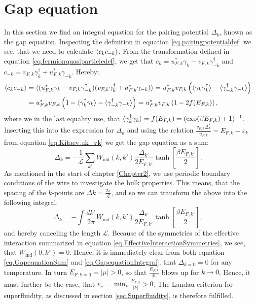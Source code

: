 \section{Gap equation} \label{sec.pairingpotential.integralequation}
In this section we find an integral equation for the pairing potential $\Delta_k$, known as the gap equation. Inspecting the definition in equation \eqref{eq.pairingpotentialdef} we see, that we need to calculate $\braket{ c_k c_{-k} }$. From the transformation defined in equation \eqref{eq.fermionquasiparticledef}, we get that $c_k = u^*_{F,k}\gamma_k - v_{F,k}\gamma^\dagger_{-k}$ and $c_{-k} = v_{F,k}\gamma^\dagger_k + u^*_{F,k}\gamma_{-k}$. Hereby:
\begin{align}
\braket{c_k c_{-k}} &= \braket{ (u^*_{F,k}\gamma_k - v_{F,k}\gamma^\dagger_{-k}) (v_{F,k}\gamma^\dagger_k + u^*_{F,k}\gamma_{-k}) } = u^*_{F,k}v_{F,k}\left( \braket{ \gamma_k \gamma^\dagger_{k} } - \braket{ \gamma^\dagger_{-k} \gamma_{-k} } \right)  \nonumber \\
& =  u^*_{F,k}v_{F,k}\left( 1 - \braket{ \gamma^\dagger_{k} \gamma_k } - \braket{ \gamma^\dagger_{-k} \gamma_{-k} } \right) = u^*_{F,k}v_{F,k}\left(1 - 2f(E_{F,k})\right), \nonumber
\end{align}
where we in the last equality use, that $\braket{ \gamma^\dagger_{k} \gamma_{k} }= f(E_{F,k})=(\exp(\beta E_{F,k})+1)^{-1} $. Inserting this into the expression for $\Delta_k$ and using the relation $\frac{v_{F,k}\Delta^*_k}{u_{F,k}}=E_{F,k}-\varepsilon_k$ from equation \eqref{eq.Kitaev.uk_vk} we get the gap equation as a sum:
\begin{equation}
\Delta_k = - \frac{1}{\mathcal{L}}\sum_{k'} W_{\text{ind}}(k,k')\frac{\Delta_{k'}}{2E_{F,k'}}\tanh\left[\frac{\beta E_{F,k'}}{2}\right].
\label{eq.GapequationSum}
\end{equation} 
As mentioned in the start of chapter \ref{Chapter2}, we use periodic boundary conditions of the wire to investigate the bulk properties. This means, that the spacing of the $k$-points are $\Delta k = \frac{2\pi}{\mathcal{L}}$, and so we can transform the above into the following integral:
\begin{equation}
\Delta_k = - \int \frac{dk'}{2\pi} W_{\text{ind}}(k,k')\frac{\Delta_{k'}}{2E_{F,k'}}\tanh\left[\frac{\beta E_{F,k'}}{2}\right], 
\label{eq.GapequationIntegral}
\end{equation} 
and hereby canceling the length $\mathcal{L}$. Because of the symmetries of the effective interaction summarized in equation \eqref{eq.EffectiveInteractionSymmetries}, we see, that $W_{\text{ind}}(0,k') = 0$. Hence, it is immediately clear from both equation \eqref{eq.GapequationSum} and \eqref{eq.GapequationIntegral}, that $\Delta_{k=0} = 0$ for any temperature. In turn $E_{F, k=0} = |\mu| > 0$, so that $\frac{E_{F,k}}{|k|}$ blows up for $k\to 0$. Hence, it must further be the case, that $v_c = \min_k \frac{E_{F,k}}{|k|} > 0$. The Landau criterion for superfluidity, as discussed in section \ref{sec.Superfluidity}, is therefore fulfilled. 

